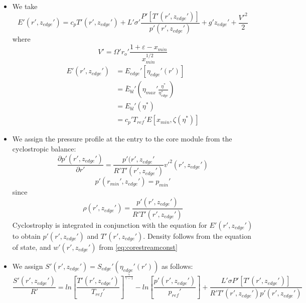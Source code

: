 \documentclass[preprint, prX]{revtex4}
\newcommand{\sbfrac}[2]{\left[\frac{#1}{#2}\right]}
\newcommand{\pd}[2]{\frac{\partial#1}{\partial#2}}
\newcommand{\gogmo}{\frac{\gamma}{\gamma-1}}
\newcommand{\rmin}{r_{min}}
\newcommand{\xmin}{x_{min}}
\newcommand{\zedge}{z_{edge}}
\begin{document}
\begin{itemize}
\item
We take
\begin{equation}
E'(r',\zedge') = c_p T'(r',\zedge') + L'\sigma'\frac{P'[T'(r',\zedge')]}{p'(r',\zedge')} + g'\zedge' + \frac{V'^2}{2}
\end{equation}
where
\begin{equation}
V' = \Omega'r_o' \frac{1 + \varepsilon - \xmin}{\xmin^{1/2}}
\end{equation}
\begin{equation}
\begin{split}
E'(r',\zedge') &= E_{edge}'[\eta_{edge}'(r')] \\
&= \bar{E}_{bl}'\left( \eta_{max}' \frac{\eta^*}{\eta_{edge}^*}\right) \\
&= E_{bl}'(\eta^*) \\
&= c_p'T_{ref}' E[\xmin, \zeta(\eta^*)]
\end{split}
\end{equation}
\item
We assign the pressure profile at the entry to the core module from the cyclostropic balance:
\begin{equation}
\pd{p'(r',\zedge')}{r'} = \frac{p'(r',\zedge'}{R'T'(r',\zedge')}v'^2(r',\zedge')
\end{equation}
\begin{equation}
p'(\rmin', \zedge') = p_{min}'
\end{equation}
since
\begin{equation}
\rho(r',\zedge') = \frac{p'(r',\zedge')}{R'T'(r',\zedge')}
\end{equation}
Cyclostrophy is integrated in conjunction with the equation for $E'(r',\zedge')$ to obtain $p'(r',\zedge')$ and $T'(r',\zedge')$. Density follows from the equation of state, and $w'(r',\zedge')$ from \eqref{eq:corestreamconst}
\item
We assign $S'(r',\zedge') = S_{edge}'(\eta_{edge}'(r'))$ as follows:
\begin{equation}
\frac{S'(r',\zedge')}{R'} = ln \sbfrac{T'(r',\zedge')}{T_{ref}'}^\gogmo - ln \sbfrac{p'(r',\zedge')}{p_{ref}'} + \frac{L'\sigma P'[T'(r',\zedge')]}{R'T'(r',\zedge')p'(r',\zedge')}
\end{equation}
\end{itemize}
\end{document}
